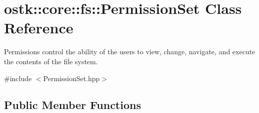 \hypertarget{classostk_1_1core_1_1fs_1_1_permission_set}{}\section{ostk\+:\+:core\+:\+:fs\+:\+:Permission\+Set Class Reference}
\label{classostk_1_1core_1_1fs_1_1_permission_set}


Permissions control the ability of the users to view, change, navigate, and execute the contents of the file system.  




{\ttfamily \#include $<$Permission\+Set.\+hpp$>$}

\subsection*{Public Member Functions}
